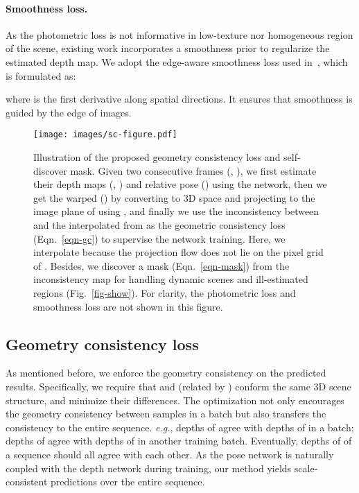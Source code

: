 \documentclass{article}
\newcommand{\figref}[1]{Fig.~\ref{#1}}
\newcommand{\equref}[1]{Eqn.~\ref{#1}}
\def\eg{\emph{e.g.}}
\begin{document}
\paragraph{Smoothness loss.}
As the photometric loss is not informative in low-texture nor homogeneous region of the scene,
existing work incorporates a smoothness prior to regularize the estimated depth map.
We adopt the edge-aware smoothness loss used in~\cite{ranjan2019cc}, which is formulated as:

where  is the first derivative along spatial directions. 
It ensures that smoothness is guided by the edge of images.


\begin{figure}[!t]
\centering
\texttt{[image: images/sc-figure.pdf]}
\caption{Illustration of the proposed geometry consistency loss and self-discover mask.
Given two consecutive frames (, ), we first estimate their depth maps (, ) and relative pose () using the network,
then we get the warped () by converting  to 3D space and projecting to the image plane of  using ,
and finally we use the inconsistency between  and the  interpolated from  as the geometric consistency loss  (\equref{eqn-gc}) to supervise the network training.
Here, we interpolate  because the projection flow does not lie on the pixel grid of .
Besides, we discover a mask  (\equref{eqn-mask}) from the inconsistency map for handling dynamic scenes and ill-estimated regions (\figref{fig-show}).
For clarity, the photometric loss and smoothness loss are not shown in this figure.
}
\label{fig-sdm}
 \vspace{-2mm}
\end{figure}


\subsection{Geometry consistency loss}\label{sec-gc}

As mentioned before, we enforce the geometry consistency on the predicted results.
Specifically, we require that  and  (related by ) conform the same 3D scene structure,
and minimize their differences.
The optimization not
only encourages the geometry consistency between samples in a batch but also transfers the consistency to the entire sequence. 
\eg, depths of  agree with depths of  in a batch; depths of  agree with depths of  in another training batch. 
Eventually, depths of  of a sequence should all agree with each other.
As the pose network is naturally coupled with the depth network during training, our method yields scale-consistent predictions over the entire sequence.
\end{document}
